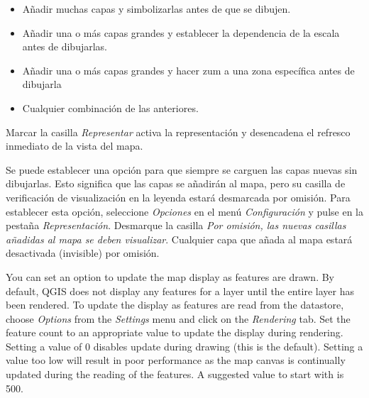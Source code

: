 \begin{itemize}
\item Añadir muchas capas y simbolizarlas antes de que se dibujen.
\item Añadir una o más capas grandes y establecer la dependencia de la escala antes de dibujarlas.
\item Añadir una o más capas grandes y hacer zum a una zona específica antes de dibujarla
\item Cualquier combinación de las anteriores.
\end{itemize}

Marcar la casilla \textit{Representar} activa la representación y desencadena el refresco inmediato de la vista del mapa.

\label{label_settinglayer}

Se puede establecer una opción para que siempre se carguen las capas nuevas sin dibujarlas. Esto
significa que las capas se añadirán al mapa, pero su casilla de verificación de visualización en la leyenda estará 
desmarcada por omisión. Para establecer esta opción, seleccione \textit{Opciones} en el menú \textit{Configuración} 
y pulse en la pestaña \textit{Representación}. Desmarque la casilla \textit{Por omisión, las nuevas casillas añadidas 
al mapa se deben visualizar}. Cualquier capa que añada al mapa estará desactivada (invisible) por omisión.

%
%

\label{label_updatemap}

You can set an option to update the map display as features are drawn. By
default, QGIS does not display any features for a layer until the entire
layer has been rendered. To update the display as features are read from the
datastore, choose \textit{Options} from the \textit{Settings} menu and
click on the \textit{Rendering} tab. Set the feature count to an
appropriate value to update the display during rendering. Setting a value of 0
disables update during drawing (this is the default). Setting a value too low
will result in poor performance as the map canvas is continually updated
during the reading of the features. A suggested value to start with is 500. 

